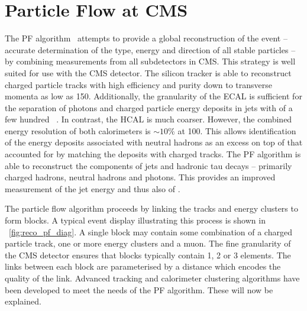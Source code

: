 \section{Particle Flow at \ac{CMS}}
\label{sec:reco_pf}
The \ac{PF} algorithm~\cite{cms_pf_pas, cms_pf_pas2} attempts to provide a
global reconstruction of the event -- accurate determination of the type, energy
and direction of all stable particles -- by combining measurements from all
subdetectors in \ac{CMS}. This strategy is well suited for use with the \ac{CMS}
detector. The silicon tracker is able to reconstruct charged particle tracks
with high efficiency and purity down to transverse momenta as low as
\unit{150}{\MeV}. Additionally, the granularity of the \ac{ECAL} is sufficient
for the separation of photons and charged particle energy deposits in jets with
\Pt of a few hundred \GeV~\cite{cms_pf_pas}. In contrast, the \ac{HCAL} is much
coarser. However, the combined energy resolution of both calorimeters is $\sim
10\%$ at \unit{100}{\GeV}. This allows identification of the energy deposits
associated with neutral hadrons as an excess on top of that accounted for by
matching the deposits with charged tracks. The \ac{PF} algorithm is able to
reconstruct the components of jets and hadronic tau decays -- primarily charged
hadrons, neutral hadrons and photons. This provides an improved measurement of
the jet energy and thus also of \METv.

The particle flow algorithm proceeds by linking the tracks and energy clusters
to form blocks. A typical event display illustrating this process is shown in
\fig~\ref{fig:reco_pf_diag}. A single block may contain some combination of a
charged particle track, one or more energy clusters and a muon. The fine
granularity of the \ac{CMS} detector ensures that blocks typically contain 1, 2
or 3 elements.  The links between each block are parameterised by a distance
which encodes the quality of the link. Advanced tracking and calorimeter
clustering algorithms have been developed to meet the needs of the \ac{PF}
algorithm. These will now be explained.

